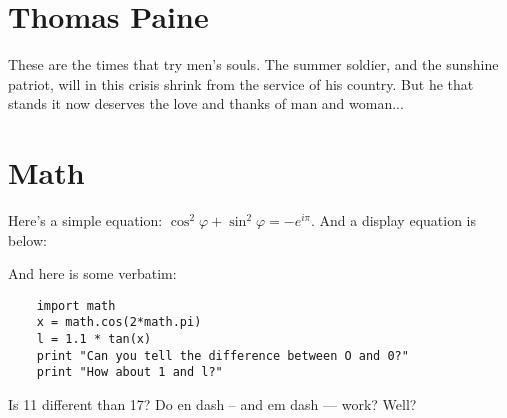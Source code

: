 \documentclass[12pt,letterpaper]{scrartcl}
\newcommand{\laplace}{$$\int_0^\infty \mathup  e^{-st}f(t)$$}
\begin{document}
\section{Thomas Paine}
    
    These are the times that try men's souls. The summer soldier, and the sunshine patriot, will in this crisis shrink from the service of his country. But he that stands it now deserves the love and thanks of man and woman...

\section{Math}

Here's a simple equation: $\cos^2 \varphi + \sin^2 \varphi = -e^{i\pi}$. And a display equation is below:


And here is some verbatim:
\begin{lstlisting}
    import math
    x = math.cos(2*math.pi)
    l = 1.1 * tan(x)
    print "Can you tell the difference between O and 0?"
    print "How about 1 and l?"
\end{lstlisting}  

Is 11 different than 17? Do en dash -- and em dash --- work? Well?

    
\end{document}
